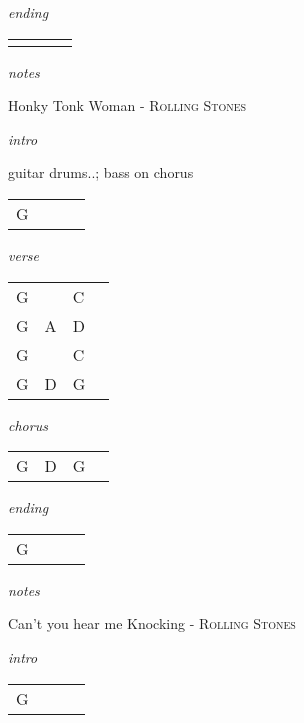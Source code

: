 \documentclass[12pt]{article}
\begin{document}
\textit{ending}

\begin{tabular}{|P{1.25in}|P{1.25in}|P{1.25in}|P{1.25in}|}
    &   &   &   \\
\end{tabular}

\textit{notes}

\newpage


{\Huge Honky Tonk Woman} {\huge - \textsc{Rolling Stones}}

\huge
\textit{intro}

guitar drums..; bass on chorus

\begin{tabular}{|P{1.25in}|P{1.25in}|P{1.25in}|P{1.25in}|}
  G &   &   &   \\
\end{tabular}

\textit{verse}

\begin{tabular}{|P{1.25in}|P{1.25in}|P{1.25in}|P{1.25in}|}
  G &   & C  &   \\
  G & A  &  D &   \\
  G &   & C  &   \\
  G & D & G  &   \\
\end{tabular}

\textit{chorus}

\begin{tabular}{|P{1.25in}|P{1.25in}|P{1.25in}|P{1.25in}|}
  G &  D & G  &   \\
\end{tabular}

\textit{ending}

\begin{tabular}{|P{1.25in}|P{1.25in}|P{1.25in}|P{1.25in}|}
  G &   &   &   \\
\end{tabular}

\textit{notes}

\newpage

{\Huge Can't you hear me Knocking} {\huge - \textsc{Rolling Stones}}

\huge
\textit{intro}

\begin{tabular}{|P{1.25in}|P{1.25in}|P{1.25in}|P{1.25in}|}
  G &   &   &   \\
\end{tabular}
\end{document}
